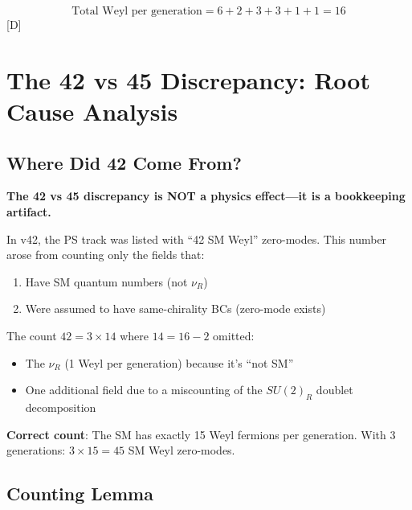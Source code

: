 \documentclass[11pt,a4paper]{article}
\newcommand{\tagD}{\textcolor{blue!70!black}{[D]}}
\begin{document}
\begin{equation}
\label{eq:total-weyl-gen}
\text{Total Weyl per generation} = 6 + 2 + 3 + 3 + 1 + 1 = 16
\end{equation}
\tagD

\section{The 42 vs 45 Discrepancy: Root Cause Analysis}
\label{sec:42-vs-45}

\subsection{Where Did 42 Come From?}

\begin{trapbox}
\textbf{The 42 vs 45 discrepancy is NOT a physics effect---it is a bookkeeping artifact.}

In v42, the PS track was listed with ``42 SM Weyl'' zero-modes. This number arose from
counting only the fields that:
\begin{enumerate}
    \item Have SM quantum numbers (not $\nu_R$)
    \item Were assumed to have same-chirality BCs (zero-mode exists)
\end{enumerate}

The count $42 = 3 \times 14$ where $14 = 16 - 2$ omitted:
\begin{itemize}
    \item The $\nu_R$ (1 Weyl per generation) because it's ``not SM''
    \item One additional field due to a miscounting of the $SU(2)_R$ doublet decomposition
\end{itemize}

\textbf{Correct count}: The SM has exactly 15 Weyl fermions per generation. With 3 generations:
$3 \times 15 = 45$ SM Weyl zero-modes.
\end{trapbox}

\subsection{Counting Lemma}
\end{document}
